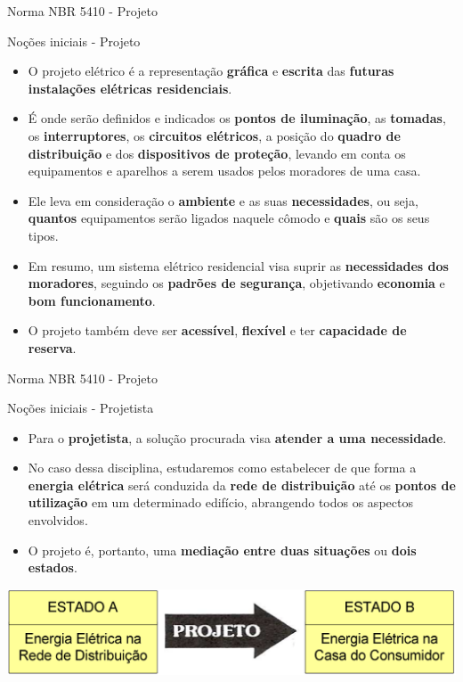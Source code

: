 \begin{frame}{Norma NBR 5410 - Projeto}
	\begin{block}{Noções iniciais - Projeto}
		\begin{itemize}
			\item  O projeto elétrico é a representação \textbf{gráfica} e \textbf{escrita} das \textbf{futuras instalações elétricas residenciais}.
			\item É onde serão definidos e indicados os \textbf{pontos de iluminação}, as \textbf{tomadas}, os \textbf{interruptores}, os \textbf{circuitos elétricos}, a posição do \textbf{quadro de distribuição} e dos \textbf{dispositivos de proteção}, levando em conta os equipamentos e aparelhos a serem usados pelos moradores de uma casa.
			\item Ele leva em consideração o \textbf{ambiente} e as suas \textbf{necessidades}, ou seja, \textbf{quantos} equipamentos serão ligados naquele cômodo e \textbf{quais} são os seus tipos.
			\item Em resumo, um sistema elétrico residencial visa suprir as \textbf{necessidades dos moradores}, seguindo os \textbf{padrões de segurança}, objetivando \textbf{economia} e \textbf{bom funcionamento}.
			\item O projeto também deve ser \textbf{acessível}, \textbf{flexível} e ter \textbf{capacidade de reserva}.
		\end{itemize}
	\end{block}


\end{frame}


\begin{frame}{Norma NBR 5410 - Projeto}
	\begin{block}{Noções iniciais - Projetista}
		\begin{itemize}
			\item Para o \textbf{projetista}, a solução procurada visa \textbf{atender a uma necessidade}.
			\item No caso dessa disciplina, estudaremos como estabelecer de que forma a \textbf{energia elétrica} será conduzida da \textbf{rede de distribuição} até os \textbf{pontos de utilização} em um determinado edifício, abrangendo todos os aspectos envolvidos.
			\item O projeto é, portanto, uma \textbf{mediação entre duas situações} ou \textbf{dois estados}.
		\end{itemize}
	\end{block}

	\bigskip

	\centering
	\includegraphics[width=0.7\linewidth]{Figuras/Ch02/fig4}


\end{frame}


